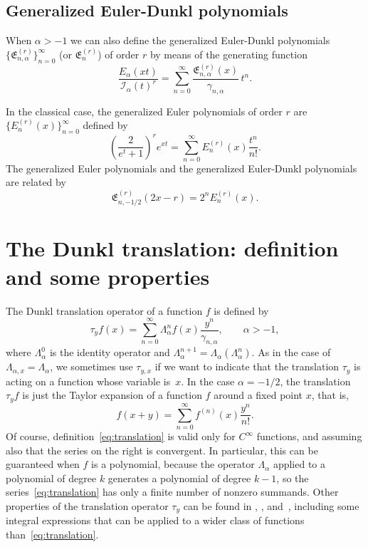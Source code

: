 \documentclass[a4paper]{amsart}
\newcommand{\I}{\mathcal{I}}
\newcommand{\Ea}{E_{\alpha}}
\newcommand{\cc}{\gamma}
\newcommand{\E}{\mathfrak{E}}
\newcommand{\La}{\Lambda_{\alpha}}
\newcommand{\Lax}{\Lambda_{\alpha,x}}
\theoremstyle{plain}
\theoremstyle{definition}
\theoremstyle{remark}
\numberwithin{equation}{section}
\begin{document}

\subsection{Generalized Euler-Dunkl polynomials}

When $\alpha>-1$ we can also define the generalized Euler-Dunkl polynomials $\{\E_{n,\alpha}^{(r)}\}_{n=0}^{\infty}$ (or $\E_n^{(r)}$) of order $r$ by means of the generating function
\begin{equation*}
  \frac{\Ea(xt)}{\I_{\alpha}(t)^r}
  = \sum_{n=0}^\infty \frac{\E_{n,\alpha}^{(r)}(x)}{\cc_{n,\alpha}}\,t^n.
\end{equation*}

In the classical case, the generalized Euler polynomials of order $r$ are $\{E_{n}^{(r)}(x)\}_{n=0}^\infty$ defined by
\[
  \left(\frac{2}{e^t+1}\right)^r e^{xt} 
  = \sum_{n=0}^\infty E_{n}^{(r)}(x) \frac{t^n}{n!}.
\]
The generalized Euler polynomials and the generalized Euler-Dunkl polynomials are related by
\[
  \E_{n,-1/2}^{(r)}(2x-r) = 2^n E_n^{(r)}(x).
\]


\section{The Dunkl translation: definition and some properties}
\label{sec:Dtau}

The Dunkl translation operator of a function $f$ is defined by
\begin{equation}
\label{eq:translation}
  \tau_y f(x) = \sum_{n=0}^\infty \La^{n}f(x) \frac{y^n}{\cc_{n,\alpha}},
  \qquad \alpha>-1,
\end{equation}
where $\La^0$ is the identity operator and $\La^{n+1} = \La(\La^n)$.  
As in the case of $\Lax = \La$, we sometimes use $\tau_{y,x}$ if we want to indicate that the translation $\tau_{y}$ is acting on a function whose variable is~$x$.
In the case $\alpha=-1/2$, the translation $\tau_y f$ is just the Taylor expansion of a function $f$ around a fixed point $x$, that is,
\[
  f(x+y) = \sum_{n=0}^\infty f^{(n)}(x) \frac{y^n}{n!}.
\]
Of course, definition~\eqref{eq:translation} is valid only for $C^{\infty}$ functions, and assuming also that the series on the right is convergent. In particular, this can be guaranteed when $f$ is a polynomial, because the operator $\La$ applied to a polynomial of degree $k$ generates a polynomial of degree $k-1$, so the series~\eqref{eq:translation} has only a finite number of nonzero summands. 
Other properties of the translation operator $\tau_y$
can be found in \cite{Ros}, \cite{Rosler-TAMS}, \cite{ThX} and~\cite{LiLiao}, 
including some integral expressions that can be applied to a wider class of functions than~\eqref{eq:translation}.
\end{document}
